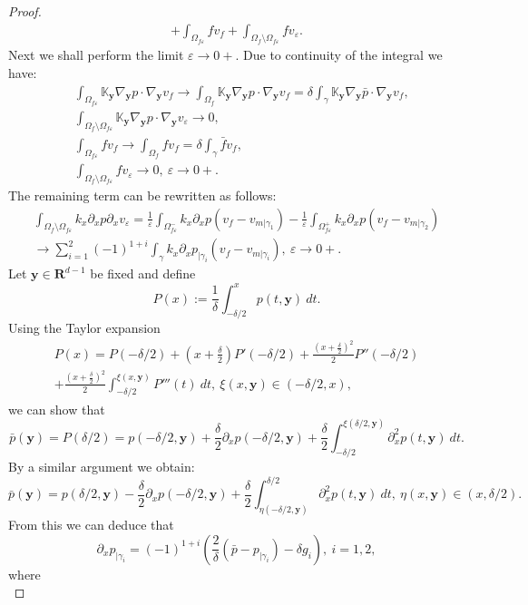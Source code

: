 \documentclass{llncs}
\def\vc#1{\mathbf{\boldsymbol{#1}}}     %
\def\tn#1{{\mathbb{#1}}}    %
\def\ep{\varepsilon}
\def\Real{{\mathbf R}}
\def\yy{{\vc y}}
\begin{document}
\begin{proof}
\begin{multline}
+ \int_{\Omega_{f\ep}} f v_f
+ \int_{\Omega_f\setminus\Omega_{f\ep}} f v_\ep.
\end{multline}
Next we shall perform the limit $\ep\to 0+$.
Due to continuity of the integral we have:
\begin{align}
&\int_{\Omega_{f\ep}}\tn K_\yy\nabla_\yy p\cdot\nabla_\yy v_f \to \int_{\Omega_f}\tn K_\yy\nabla_\yy p\cdot\nabla_\yy v_f = \delta\int_\gamma\tn K_\yy\nabla_\yy\bar p\cdot\nabla_\yy v_f,\\
&\int_{\Omega_f\setminus\Omega_{f\ep}} \tn K_\yy\nabla_\yy p \cdot \nabla_\yy v_\ep \to 0, \\
&\int_{\Omega_{f\ep}} f v_f \to \int_{\Omega_f} f v_f = \delta\int_{\gamma} \bar f v_f, \\
&\int_{\Omega_f\setminus\Omega_{f\ep}} f v_\ep \to 0,~\ep\to 0+.
\end{align}
The remaining term can be rewritten as follows:
\begin{multline}
\int_{\Omega_f\setminus\Omega_{f\ep}} k_x\partial_x p \partial_x v_\ep
= \frac1\ep\int_{\Omega_{f\ep}^-} k_x\partial_x p (v_f-v_{m|\gamma_1})
- \frac1\ep\int_{\Omega_{f\ep}^+} k_x\partial_x p (v_f - v_{m|\gamma_2})\\
\to \sum_{i=1}^2(-1)^{1+i}\int_\gamma k_x \partial_x p_{|\gamma_i} (v_f - v_{m|\gamma_i}),~\ep\to 0+.
\end{multline}
Let $\vc y\in\Real^{d-1}$ be fixed and define
\[ P(x):=\frac1\delta\int_{-\delta/2}^{x}p(t,\vc y)~dt. \]
Using the Taylor expansion 
\begin{multline}
P(x) = P(-\delta/2) + (x+\frac\delta2)P'(-\delta/2) + \frac{(x+\frac\delta2)^2}{2}P''(-\delta/2)\\
+ \frac{(x+\frac\delta2)^2}2\int_{-\delta/2}^{\xi(x,\vc y)}P'''(t)~dt,~\xi(x,\vc y)\in(-\delta/2,x),
\end{multline}
we can show that
\[ \bar p(\vc y) = P(\delta/2) = p(-\delta/2,\vc y) + \frac\delta2\partial_x p(-\delta/2,\vc y) + \frac\delta2\int_{-\delta/2}^{\xi(\delta/2,\vc y)}\partial_x^2 p(t,\vc y)~dt. \]
By a similar argument we obtain:
\[ \bar p(\vc y) = p(\delta/2,\vc y) - \frac\delta2\partial_x p(-\delta/2,\vc y) + \frac\delta2\int_{\eta(-\delta/2,\vc y)}^{\delta/2}\partial_x^2 p(t,\vc y)~dt,~\eta(x,\vc y)\in(x,\delta/2). \]
From this we can deduce that
\begin{equation}
\label{eq:taylor_for_du}
\partial_x p_{|\gamma_i} = (-1)^{1+i}\left(\frac2\delta(\bar p - p_{|\gamma_i}) - \delta g_i\right),~i=1,2,
\end{equation}
where
\begin{equation}

\end{equation}
\end{proof}
\end{document}
